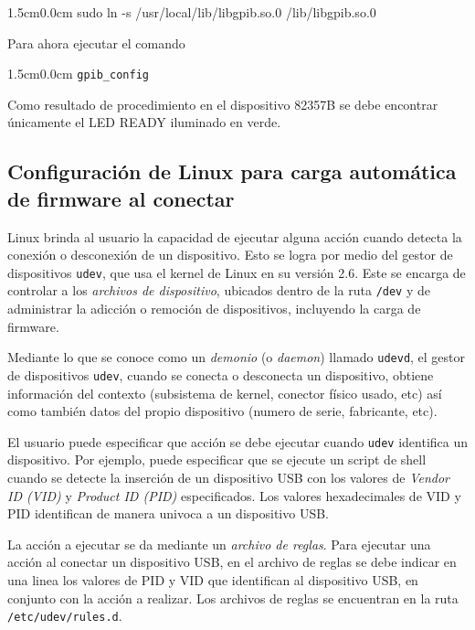 \documentclass[paper=letter,oneside,fontsize=11pt, parskip=full]{scrartcl}
\newenvironment{code}
	{\begin{adjustwidth}{1.5cm}{0.0cm}\ttfamily}
	{\end{adjustwidth}}
\begin{document}
		\begin{code}
			sudo ln -s /usr/local/lib/libgpib.so.0 /lib/libgpib.so.0
		\end{code}
		
		Para ahora ejecutar el comando
			
		\begin{code}
			\texttt{gpib\_config}
		\end{code}
	
		Como resultado de procedimiento en el dispositivo 82357B se debe encontrar únicamente el LED READY iluminado en verde.
		
	\subsection{Configuración de Linux para carga automática de firmware al conectar}
	

	Linux brinda al usuario la capacidad de ejecutar alguna acción cuando detecta la conexión o desconexión de un dispositivo. Esto se logra por medio del gestor de dispositivos \texttt{udev}, que usa el kernel de Linux en su versión 2.6. Este se encarga de controlar a los \emph{archivos de dispositivo}, ubicados dentro de la ruta \texttt{/dev} y de administrar la adicción o remoción de dispositivos, incluyendo la carga de firmware.
	
	Mediante lo que se conoce como un \emph{demonio} (o \emph{daemon}) llamado \texttt{udevd}, el gestor de dispositivos \texttt{udev}, cuando se conecta o desconecta un dispositivo, obtiene información del contexto (subsistema de kernel, conector físico usado, etc) así como también datos del propio dispositivo (numero de serie, fabricante, etc).
	
	El usuario puede especificar que acción se debe ejecutar cuando \texttt{udev} identifica un dispositivo. Por ejemplo, puede especificar que se ejecute un script de shell cuando se detecte la inserción de un dispositivo USB con los valores de \emph{Vendor ID (VID)} y \emph{Product ID (PID)} especificados. Los valores hexadecimales de VID y PID identifican de manera univoca a un dispositivo USB.
	
	La acción a ejecutar se da mediante un \emph{archivo de reglas}. Para ejecutar una acción al conectar un dispositivo USB, en el archivo de reglas se debe indicar en una linea los valores de PID y VID que identifican al dispositivo USB, en conjunto con la acción a realizar. Los archivos de reglas se encuentran en la ruta \texttt{/etc/udev/rules.d}.
	
\end{document}
